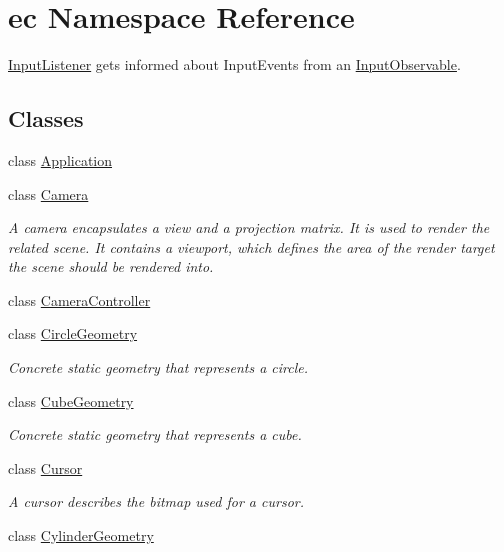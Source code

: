 \hypertarget{namespaceec}{}\section{ec Namespace Reference}
\label{namespaceec}


\mbox{\hyperlink{classec_1_1_input_listener}{Input\+Listener}} gets informed about Input\+Events from an \mbox{\hyperlink{classec_1_1_input_observable}{Input\+Observable}}.  


\subsection*{Classes}
\begin{DoxyCompactItemize}
\item 
class \mbox{\hyperlink{classec_1_1_application}{Application}}
\item 
class \mbox{\hyperlink{classec_1_1_camera}{Camera}}
\begin{DoxyCompactList}\small\item\em A camera encapsulates a view and a projection matrix. It is used to render the related scene. It contains a viewport, which defines the area of the render target the scene should be rendered into. \end{DoxyCompactList}\item 
class \mbox{\hyperlink{classec_1_1_camera_controller}{Camera\+Controller}}
\item 
class \mbox{\hyperlink{classec_1_1_circle_geometry}{Circle\+Geometry}}
\begin{DoxyCompactList}\small\item\em Concrete static geometry that represents a circle. \end{DoxyCompactList}\item 
class \mbox{\hyperlink{classec_1_1_cube_geometry}{Cube\+Geometry}}
\begin{DoxyCompactList}\small\item\em Concrete static geometry that represents a cube. \end{DoxyCompactList}\item 
class \mbox{\hyperlink{classec_1_1_cursor}{Cursor}}
\begin{DoxyCompactList}\small\item\em A cursor describes the bitmap used for a cursor. \end{DoxyCompactList}\item 
class \mbox{\hyperlink{classec_1_1_cylinder_geometry}{Cylinder\+Geometry}}

\end{DoxyCompactItemize}
